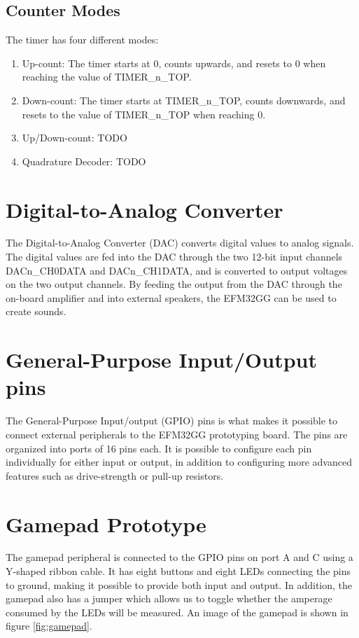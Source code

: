 \subsection{Counter Modes}
The timer has four different modes:
\begin{enumerate}
	\item Up-count: The timer starts at 0, counts upwards, and resets to 0 when reaching the value of TIMER\_n\_TOP.
	\item Down-count: The timer starts at TIMER\_n\_TOP, counts downwards, and resets to the value of TIMER\_n\_TOP when reaching 0.

	\item Up/Down-count: TODO %
	\item Quadrature Decoder: TODO %
\end{enumerate}


\section{Digital-to-Analog Converter}
The Digital-to-Analog Converter (DAC) converts digital values to analog signals. The digital values are fed into the DAC through the two 12-bit input channels DACn\_CH0DATA and DACn\_CH1DATA, and is converted to output voltages on the two output channels. By feeding the output from the DAC through the on-board amplifier and into external speakers, the EFM32GG can be used to create sounds.


\section{General-Purpose Input/Output pins}
The General-Purpose Input/output (GPIO) pins is what makes it possible to connect external peripherals to the EFM32GG prototyping board. The pins are organized into ports of 16 pins each. It is possible to configure each pin individually for either input or output, in addition to configuring more advanced features such as drive-strength or pull-up resistors.


\section{Gamepad Prototype}
The gamepad peripheral is connected to the GPIO pins on port A and C using a Y-shaped ribbon cable. It has eight buttons and eight LEDs connecting the pins to ground, making it possible to provide both input and output. In addition, the gamepad also has a jumper which allows us to toggle whether the amperage consumed by the LEDs will be measured. An image of the gamepad is shown in figure \ref{fig:gamepad}.


